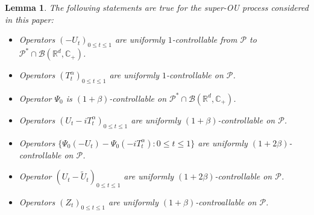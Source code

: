 \documentclass[12pt]{amsart}
\theoremstyle{plain}
\newtheorem{lem}[thm]{Lemma}
\theoremstyle{definition}
\numberwithin{equation}{section}
\begin{document}
\begin{lem}
\label{lem: upper bound for usgx}
The following statements are true for the super-OU process considered in this paper:
\begin{itemize}
\item[(1)]
    Operators $(-U_t)_{0\leq t\leq 1}$ are uniformly $1$-controllable from $\mathcal P$ to $\mathcal P^*\cap \mathcal B(\mathbb R^d, \mathbb C_+)$.
\item[(2)]
    Operators $(T^\alpha_t)_{0\leq t\leq 1}$ are uniformly $1$-controllable on $\mathcal P$.
\item[(3)]
    Operator $\Psi_0$ is $(1+\beta)$-controllable on $\mathcal P^* \cap \mathcal B(\mathbb R^d, \mathbb C_+)$.
\item[(4)]
    Operators $(U_t- iT_t^{\alpha})_{0\leq t\leq 1}$ are uniformly $(1+\beta)$-controllable on $\mathcal P$.
\item[(5)]
    Operators $\{\Psi_0(-U_t) - \Psi_0(-iT_t^\alpha): 0\leq t\leq 1\}$ are uniformly $(1+2\beta)$-controllable on $\mathcal P$.
\item[(6)]
    Operator $(U_t-\tilde U_t)_{0\leq t\leq 1}$ are uniformly $(1+2\beta)$-controllable on $\mathcal P$.
\item[(7)]
    Operators $(Z_t)_{0\leq t\leq 1}$ are uniformly $(1+\beta)$-controallable on $\mathcal P$.
\end{itemize}
\end{lem}
\end{document}
